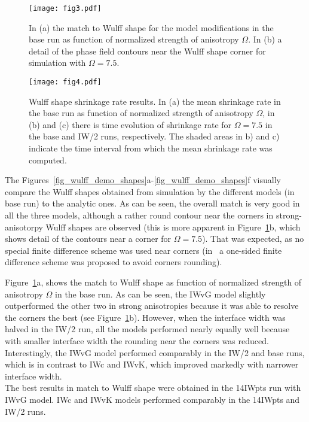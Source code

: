 \begin{figure}[]
	\centering
	\texttt{[image: fig3.pdf]}
	\caption[Quantified match to the Wulff shape for the model modifications in the base run]{In (a) the match to Wulff shape for the model modifications in the base run as function of normalized strength of anisotropy $\Omega$. In (b) a detail of the phase field contours near  the Wulff shape corner for simulation with $\Omega=7.5$.}
	\label{fig_wulff_match}
\end{figure}

\begin{figure}
	\centering
	\texttt{[image: fig4.pdf]}
	\caption[Wulff shape shrinkage rate results]{Wulff shape shrinkage rate results. In (a) the mean shrinkage rate in the base run as function of normalized strength of anisotropy $\Omega$, in (b) and (c) there is time evolution of shrinkage rate for $\Omega=7.5$ in the base and IW/2 runs, respectively. The shaded areas in b) and c) indicate the time interval from which the mean shrinkage rate was computed.}
	\label{fig_wulff_shrrate}
\end{figure}

The Figures~\ref{fig_wulff_demo_shapes}a-\ref{fig_wulff_demo_shapes}f visually compare the Wulff shapes obtained from simulation by the different models (in base run) to the analytic ones. As can be seen, the overall match is very good in all the three models, although a rather round contour near the corners in strong-anisotorpy Wulff shapes are observed (this is more apparent in Figure~\ref{fig_wulff_match}b, which shows detail of the contours near a corner for $\Omega=7.5$). That was expected, as no special finite difference scheme was used near corners (in~\cite{Eggleston2001} a one-sided finite difference scheme was proposed to avoid corners rounding). 

Figure~\ref{fig_wulff_match}a, shows the match to Wulff shape as function of normalized strength of anisotropy $\Omega$ in the base run. As can be seen, the IWvG model slightly outperformed the other two in strong anisotropies because it was able to resolve the corners the best (see Figure~\ref{fig_wulff_match}b). However, when the interface width was halved in the IW/2 run, all the models performed nearly equally well because with smaller interface width the rounding near the corners was reduced. Interestingly, the IWvG model performed comparably in the IW/2 and base runs, which is in contrast to IWc and IWvK, which improved markedly with narrower interface width. \\
The best results in match to Wulff shape were obtained in the 14IWpts run with IWvG model. IWc and IWvK models performed comparably in the 14IWpts and IW/2 runs.


